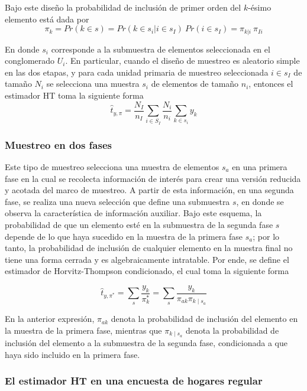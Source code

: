 \documentclass[
  12pt,
  spanish,
]{book}
\begin{document}
Bajo este diseño la probabilidad de inclusión de primer orden del \(k\)-ésimo elemento está dada por
\[
\pi_{k}=Pr(k\in s)=Pr(k\in s_i|i\in s_I)\ Pr(i\in s_I)=\pi_{k|i}\ \pi_{Ii}
\]

En donde \(s_i\) corresponde a la submuestra de elementos seleccionada en el conglomerado \(U_i\). En particular, cuando el diseño de muestreo es aleatorio simple en las dos etapas, y para cada unidad primaria de muestreo seleccionada \(i\in s_{I}\) de tamaño \(N_i\) se selecciona una muestra \(s_i\) de elementos de tamaño \(n_i\), entonces el estimador HT toma la siguiente forma
\[
\hat{t}_{y,\pi}=\frac{N_{I}}{n_{I}}\sum_{i\in S_{I}}\frac{N_i}{n_i}\sum_{k\in s_i}y_k
\]

\hypertarget{muestreo-en-dos-fases-1}{%
\subsubsection*{Muestreo en dos fases}\label{muestreo-en-dos-fases-1}}

Este tipo de muestreo selecciona una muestra de elementos \(s_a\) en una primera fase en la cual se recolecta información de interés para crear una versión reducida y acotada del marco de muestreo. A partir de esta información, en una segunda fase, se realiza una nueva selección que define una submuestra \(s\), en donde se observa la característica de información auxiliar. Bajo este esquema, la probabilidad de que un elemento esté en la submuestra de la segunda fase \(s\) depende de lo que haya sucedido en la muestra de la primera fase \(s_a\); por lo tanto, la probabilidad de inclusión de cualquier elemento en la muestra final no tiene una forma cerrada y es algebraicamente intratable. Por ende, se define el estimador de Horvitz-Thompson condicionado, el cual toma la siguiente forma

\[
\hat{t}_{y,\pi^*}=\sum_{s}\frac{y_k}{\pi_{k}^*}=\sum_{s}\frac{y_k}{\pi_{ak}\pi_{k\mid{s_a}}}
\]

En la anterior expresión, \(\pi_{ak}\) denota la probabilidad de inclusión del elemento en la muestra de la primera fase, mientras que \(\pi_{k\mid{s_a}}\) denota la probabilidad de inclusión del elemento a la submuestra de la segunda fase, condicionada a que haya sido incluido en la primera fase.

\hypertarget{el-estimador-ht-en-una-encuesta-de-hogares-regular}{%
\subsubsection*{El estimador HT en una encuesta de hogares regular}\label{el-estimador-ht-en-una-encuesta-de-hogares-regular}}
\end{document}
